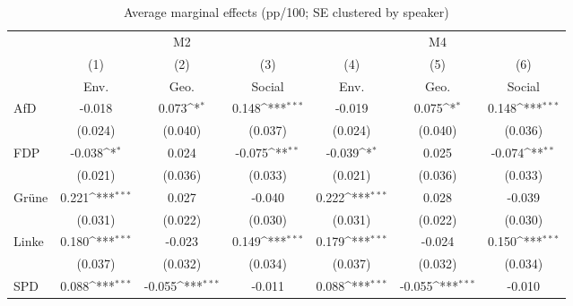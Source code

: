\begin{table}[htbp]\centering
\def\sym#1{\ifmmode^{#1}\else\(^{#1}\)\fi}
\caption{Average marginal effects (pp/100; SE clustered by speaker)}
\begin{tabular}{l*{6}{c}}
\toprule
                    &\multicolumn{3}{c}{M2}                                           &\multicolumn{3}{c}{M4}                                           \\\cmidrule(lr){2-4}\cmidrule(lr){5-7}
                    &\multicolumn{1}{c}{(1)}&\multicolumn{1}{c}{(2)}&\multicolumn{1}{c}{(3)}&\multicolumn{1}{c}{(4)}&\multicolumn{1}{c}{(5)}&\multicolumn{1}{c}{(6)}\\
                    &\multicolumn{1}{c}{Env.}&\multicolumn{1}{c}{Geo.}&\multicolumn{1}{c}{Social}&\multicolumn{1}{c}{Env.}&\multicolumn{1}{c}{Geo.}&\multicolumn{1}{c}{Social}\\
\midrule
AfD                 &      -0.018         &       0.073\sym{*}  &       0.148\sym{***}&      -0.019         &       0.075\sym{*}  &       0.148\sym{***}\\
                    &     (0.024)         &     (0.040)         &     (0.037)         &     (0.024)         &     (0.040)         &     (0.036)         \\
\addlinespace
FDP                 &      -0.038\sym{*}  &       0.024         &      -0.075\sym{**} &      -0.039\sym{*}  &       0.025         &      -0.074\sym{**} \\
                    &     (0.021)         &     (0.036)         &     (0.033)         &     (0.021)         &     (0.036)         &     (0.033)         \\
\addlinespace
Grüne               &       0.221\sym{***}&       0.027         &      -0.040         &       0.222\sym{***}&       0.028         &      -0.039         \\
                    &     (0.031)         &     (0.022)         &     (0.030)         &     (0.031)         &     (0.022)         &     (0.030)         \\
\addlinespace
Linke               &       0.180\sym{***}&      -0.023         &       0.149\sym{***}&       0.179\sym{***}&      -0.024         &       0.150\sym{***}\\
                    &     (0.037)         &     (0.032)         &     (0.034)         &     (0.037)         &     (0.032)         &     (0.034)         \\
\addlinespace
SPD                 &       0.088\sym{***}&      -0.055\sym{***}&      -0.011         &       0.088\sym{***}&      -0.055\sym{***}&      -0.010         \\

\end{tabular}
\end{table}

